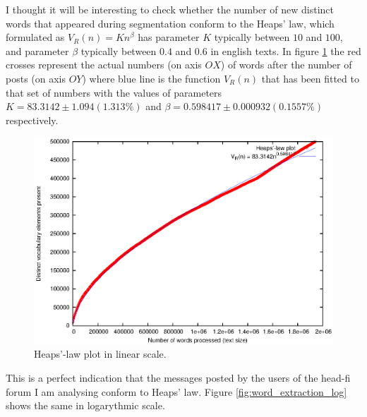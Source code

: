       I thought it will be interesting to check whether the number of new distinct words that appeared during segmentation conform to the Heaps' law, which formulated as $V_R(n) = Kn^\beta$ has parameter $K$ typically between $10$ and $100$, and parameter $\beta$ typically between $0.4$ and $0.6$ in english texts. In figure \ref{fig:word_extraction} the red crosses represent the actual numbers (on axis $OX$) of words after the number of posts (on axis $OY$) where blue line is the function $V_R(n)$ that has been fitted to that set of numbers with the values of parameters $K = 83.3142 \pm1.094 (1.313\%)$ and $\beta = 0.598417 \pm0.000932 (0.1557\%)$ respectively. 
      
      \begin{figure}[H]
        \centering
        \includegraphics[width=\textwidth]{chapters/03_implementation/extraction}
        \caption{Heaps'-law plot in linear scale.}
        \label{fig:word_extraction}
      \end{figure}
      
      This is a perfect indication that the messages posted by the users of the head-fi forum I am analysing conform to Heaps' law. Figure \ref{fig:word_extraction_log} shows the same in logarythmic scale.
      

